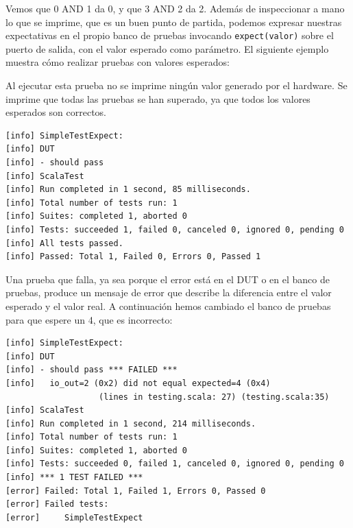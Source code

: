 \documentclass[%
    10pt,
    headinclude, footinclude=false,
    openright, %
    notitlepage,
    cleardoublepage=empty,
    headsepline,
    numbers=noenddot,
    bibliography=totoc, index=totoc,
    ]{scrbook}
\newcommand{\code}[1]{{\lstinline[basicstyle=\small\ttfamily]{#1}}}
\begin{document}

Vemos que 0 AND 1 da 0, y que 3 AND 2 da 2.
Además de inspeccionar a mano lo que se imprime, que es un buen punto de partida, podemos
expresar nuestras expectativas en el propio banco de pruebas invocando
\code{expect(valor)} sobre el puerto de salida, con el valor esperado como parámetro.
El siguiente ejemplo muestra cómo realizar pruebas con valores esperados:



Al ejecutar esta prueba no se imprime ningún valor generado por el hardware. Se imprime que todas las pruebas se han
superado, ya que todos los valores esperados son correctos.

\begin{verbatim}
[info] SimpleTestExpect:
[info] DUT
[info] - should pass
[info] ScalaTest
[info] Run completed in 1 second, 85 milliseconds.
[info] Total number of tests run: 1
[info] Suites: completed 1, aborted 0
[info] Tests: succeeded 1, failed 0, canceled 0, ignored 0, pending 0
[info] All tests passed.
[info] Passed: Total 1, Failed 0, Errors 0, Passed 1
\end{verbatim}


Una prueba que falla, ya sea porque el error está en el DUT o en el banco de pruebas,
produce un mensaje de error que describe la diferencia entre el valor esperado y el valor
real. A continuación hemos cambiado el banco de pruebas para que espere un 4, que es incorrecto:

\begin{verbatim}
[info] SimpleTestExpect:
[info] DUT
[info] - should pass *** FAILED ***
[info]   io_out=2 (0x2) did not equal expected=4 (0x4)
                   (lines in testing.scala: 27) (testing.scala:35)
[info] ScalaTest
[info] Run completed in 1 second, 214 milliseconds.
[info] Total number of tests run: 1
[info] Suites: completed 1, aborted 0
[info] Tests: succeeded 0, failed 1, canceled 0, ignored 0, pending 0
[info] *** 1 TEST FAILED ***
[error] Failed: Total 1, Failed 1, Errors 0, Passed 0
[error] Failed tests:
[error] 	SimpleTestExpect
\end{verbatim}
\end{document}
